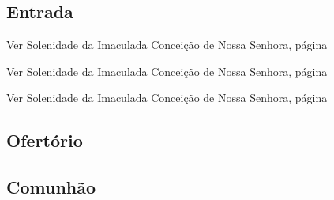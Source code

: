 
\subsection{Entrada}\label{subsection:proprium-sanctorum/in-annuntiatione-domini/introitus}

\begin{rubrica}
  Ver Solenidade da Imaculada Conceição de Nossa Senhora, página~\pageref{subsection:proprium-sanctorum/in-conceptione-immaculata-bmv/psalmus-responsorius}
\end{rubrica}

\begin{rubrica}
  Ver Solenidade da Imaculada Conceição de Nossa Senhora, página~\pageref{subsection:proprium-sanctorum/in-conceptione-immaculata-bmv/alleluia}
\end{rubrica}

\begin{rubrica}
  Ver Solenidade da Imaculada Conceição de Nossa Senhora, página~\pageref{subsection:proprium-sanctorum/in-conceptione-immaculata-bmv/psalmus-alleluiaticus}
\end{rubrica}

\AllowPageFlush

\subsection{Ofertório}\label{subsection:proprium-sanctorum/in-annuntiatione-domini/offertorium}

\subsection{Comunhão}\label{subsection:proprium-sanctorum/in-annuntiatione-domini/communio}
